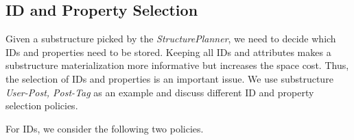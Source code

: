 \subsection{ID and Property Selection}

Given a substructure picked by the \emph{StructurePlanner}, we need to decide  which IDs and properties need to be stored. Keeping all IDs and attributes makes a substructure materialization more informative but increases the space cost. %
Thus, the selection of IDs and properties is an important issue. We  use substructure \textit{User-Post, Post-Tag} as an example and discuss different ID and property selection policies.

For IDs, we consider the following two policies.

